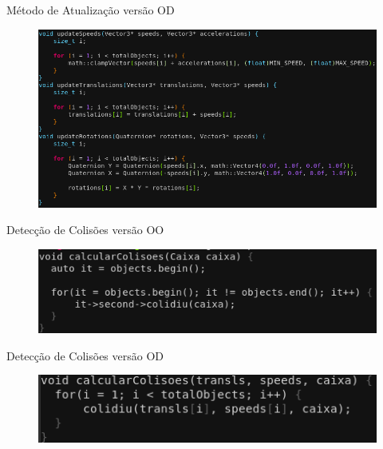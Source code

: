 \documentclass{beamer}
\begin{document}
\begin{frame}{Método de Atualização versão OD}
    \begin{figure}[h!]
        \centering
        \includegraphics[width =\textwidth]{figuras/dodupdate}
        \par\medskip
    \end{figure}
\end{frame}

\begin{frame}{Detecção de Colisões versão OO}
    \begin{figure}[h!]
        \centering
        \includegraphics[width =\textwidth]{figuras/oodcolision}
        \par\medskip
    \end{figure}
\end{frame}

\begin{frame}{Detecção de Colisões versão OD}
    \begin{figure}[h!]
        \centering
        \includegraphics[width =\textwidth]{figuras/dodcolision}
        \par\medskip
    \end{figure}
\end{frame}
\end{document}
